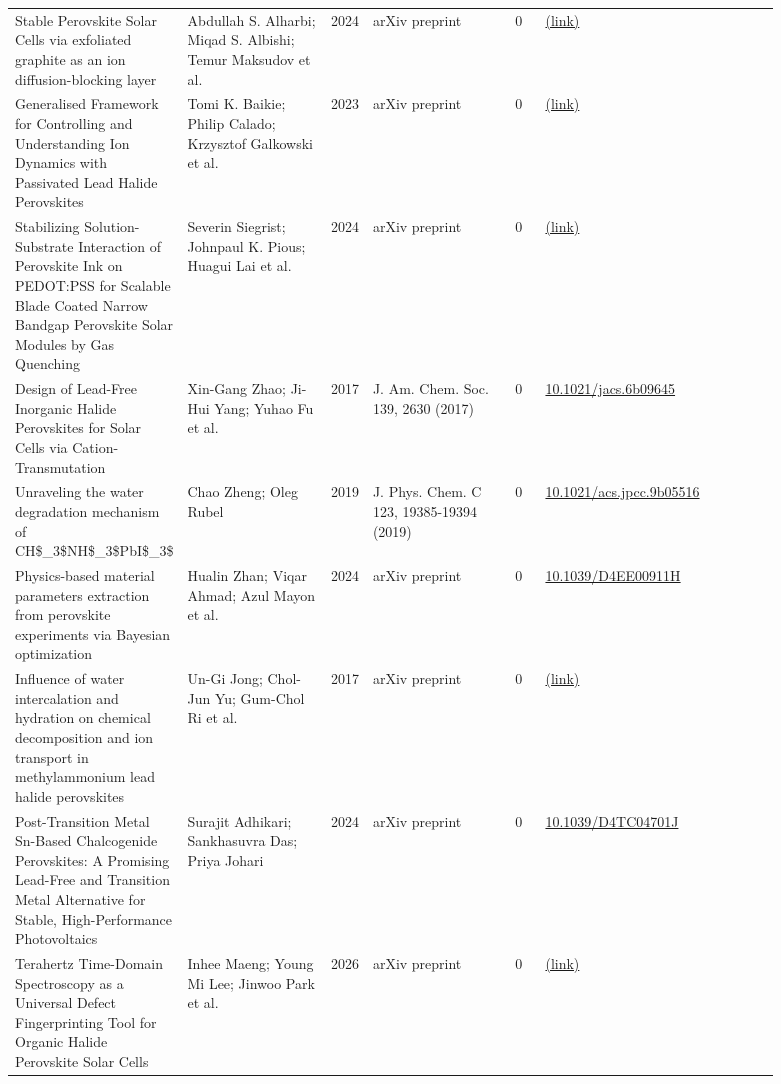 \documentclass[10pt,a4paper]{article}
\begin{document}
{\begin{longtable}{p{0.197\linewidth}p{0.197\linewidth}p{0.043\linewidth}p{0.197\linewidth}p{0.043\linewidth}p{0.117\linewidth}p{0.098\linewidth}}
Stable Perovskite Solar Cells via exfoliated graphite as an ion diffusion-blocking layer & Abdullah S. Alharbi; Miqad S. Albishi; Temur Maksudov et al. & 2024 & arXiv preprint & 0 & \href{http://arxiv.org/abs/2407.21662v1}{(link)} &  \\
Generalised Framework for Controlling and Understanding Ion Dynamics with Passivated Lead Halide Perovskites & Tomi K. Baikie; Philip Calado; Krzysztof Galkowski et al. & 2023 & arXiv preprint & 0 & \href{http://arxiv.org/abs/2305.14942v1}{(link)} &  \\
Stabilizing Solution-Substrate Interaction of Perovskite Ink on PEDOT:PSS for Scalable Blade Coated Narrow Bandgap Perovskite Solar Modules by Gas Quenching & Severin Siegrist; Johnpaul K. Pious; Huagui Lai et al. & 2024 & arXiv preprint & 0 & \href{http://arxiv.org/abs/2406.06088v1}{(link)} &  \\
Design of Lead-Free Inorganic Halide Perovskites for Solar Cells via Cation-Transmutation & Xin-Gang Zhao; Ji-Hui Yang; Yuhao Fu et al. & 2017 & J. Am. Chem. Soc. 139, 2630 (2017) & 0 & \href{https://doi.org/10.1021/jacs.6b09645}{10.1021/jacs.6b09645} &  \\
Unraveling the water degradation mechanism of CH\$\_3\$NH\$\_3\$PbI\$\_3\$ & Chao Zheng; Oleg Rubel & 2019 & J. Phys. Chem. C 123, 19385-19394 (2019) & 0 & \href{https://doi.org/10.1021/acs.jpcc.9b05516}{10.1021/acs.jpcc.9b05516} &  \\
Physics-based material parameters extraction from perovskite experiments via Bayesian optimization & Hualin Zhan; Viqar Ahmad; Azul Mayon et al. & 2024 & arXiv preprint & 0 & \href{https://doi.org/10.1039/D4EE00911H}{10.1039/D4EE00911H} &  \\
Influence of water intercalation and hydration on chemical decomposition and ion transport in methylammonium lead halide perovskites & Un-Gi Jong; Chol-Jun Yu; Gum-Chol Ri et al. & 2017 & arXiv preprint & 0 & \href{http://arxiv.org/abs/1708.07608v3}{(link)} &  \\
Post-Transition Metal Sn-Based Chalcogenide Perovskites: A Promising Lead-Free and Transition Metal Alternative for Stable, High-Performance Photovoltaics & Surajit Adhikari; Sankhasuvra Das; Priya Johari & 2024 & arXiv preprint & 0 & \href{https://doi.org/10.1039/D4TC04701J}{10.1039/D4TC04701J} &  \\
Terahertz Time-Domain Spectroscopy as a Universal Defect Fingerprinting Tool for Organic Halide Perovskite Solar Cells & Inhee Maeng; Young Mi Lee; Jinwoo Park et al. & 2026 & arXiv preprint & 0 & \href{http://arxiv.org/abs/2607.15538v1}{(link)} &  \\

\end{longtable}}
\end{document}
